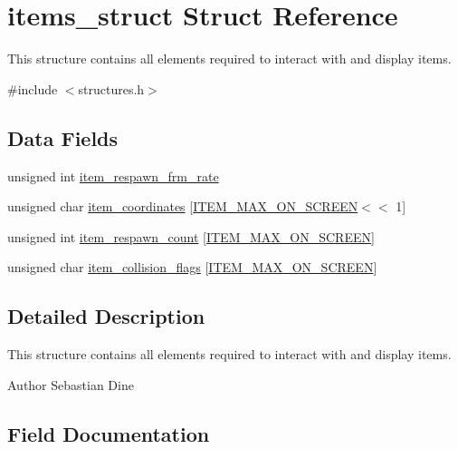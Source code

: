 \hypertarget{structitems__struct}{}\section{items\+\_\+struct Struct Reference}
\label{structitems__struct}


This structure contains all elements required to interact with and display items.  




{\ttfamily \#include $<$structures.\+h$>$}

\subsection*{Data Fields}
\begin{DoxyCompactItemize}
\item 
unsigned int \hyperlink{structitems__struct_a82d1c6f853d57e8c61d32ed8751c17b7}{item\+\_\+respawn\+\_\+frm\+\_\+rate}
\item 
unsigned char \hyperlink{structitems__struct_ae3d624d3f41bdcd547bbf2c93cac857a}{item\+\_\+coordinates} \mbox{[}\hyperlink{macros_8h_a7e03b7d3541424447645569c949aacba}{I\+T\+E\+M\+\_\+\+M\+A\+X\+\_\+\+O\+N\+\_\+\+S\+C\+R\+E\+EN}$<$$<$ 1\mbox{]}
\item 
unsigned int \hyperlink{structitems__struct_a1c6ded913b15bdbde6b7e4e1d335323c}{item\+\_\+respawn\+\_\+count} \mbox{[}\hyperlink{macros_8h_a7e03b7d3541424447645569c949aacba}{I\+T\+E\+M\+\_\+\+M\+A\+X\+\_\+\+O\+N\+\_\+\+S\+C\+R\+E\+EN}\mbox{]}
\item 
unsigned char \hyperlink{structitems__struct_a22cd37d68ba10ae58f769a0090ceb392}{item\+\_\+collision\+\_\+flags} \mbox{[}\hyperlink{macros_8h_a7e03b7d3541424447645569c949aacba}{I\+T\+E\+M\+\_\+\+M\+A\+X\+\_\+\+O\+N\+\_\+\+S\+C\+R\+E\+EN}\mbox{]}
\end{DoxyCompactItemize}


\subsection{Detailed Description}
This structure contains all elements required to interact with and display items. 

\begin{DoxyAuthor}{Author}
Sebastian Dine 
\end{DoxyAuthor}


\subsection{Field Documentation}
\hypertarget{structitems__struct_a22cd37d68ba10ae58f769a0090ceb392}{}\label{structitems__struct_a22cd37d68ba10ae58f769a0090ceb392} 
